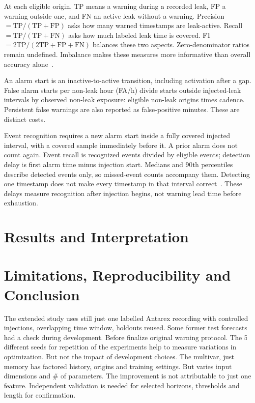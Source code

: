 \documentclass{llncs}
\begin{document}
At each eligible origin, TP means a warning during a recorded leak, FP a warning outside one, and FN an active leak without a warning. Precision $=\mathrm{TP}/(\mathrm{TP+FP})$ asks how many warned timestamps are leak-active. Recall $=\mathrm{TP}/(\mathrm{TP+FN})$ asks how much labeled leak time is covered. F1 $=2\mathrm{TP}/(2\mathrm{TP+FP+FN})$ balances these two aspects. Zero-denominator ratios remain undefined. Imbalance makes these measures more informative than overall accuracy alone~\cite{ref42}.

An alarm start is an inactive-to-active transition, including activation after a gap. False alarm starts per non-leak hour (FA/h) divide starts outside injected-leak intervals by observed non-leak exposure: eligible non-leak origins times cadence. Persistent false warnings are also reported as false-positive minutes. These are distinct costs.

Event recognition requires a new alarm start inside a fully covered injected interval, with a covered sample immediately before it. A prior alarm does not count again. Event recall is recognized events divided by eligible events; detection delay is first alarm time minus injection start. Medians and 90th percentiles describe detected events only, so missed-event counts accompany them. Detecting one timestamp does not make every timestamp in that interval correct~\cite{ref43,ref44}. These delays measure recognition after injection begins, not warning lead time before exhaustion.

\section{Results and Interpretation}


\section{Limitations, Reproducibility and Conclusion}
The extended study uses still just one labelled Antarex recording with controlled injections, overlapping time window, holdouts reused. Some former test forecasts had a check during development. Before finalize original warning protocol. The 5 different seeds for repetition of the experiments help to measure variations in optimization. But not the impact of development choices. The multivar, just memory has factored history, origins and training settings. But varies input dimensions and \# of parameters. The improvement is not attributable to just one feature. Independent validation is needed for selected horizons, thresholds and length for confirmation.
\end{document}
